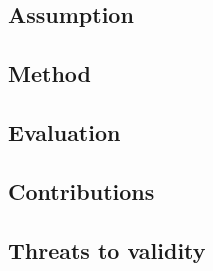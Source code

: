 \subsection{Assumption}

\subsection{Method}

\subsection{Evaluation}

\subsection{Contributions}

\subsection{Threats to validity}
